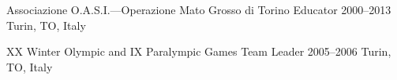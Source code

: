 \begin{cventries}

    

    
  \cventry
    {Associazione O.A.S.I.---Operazione Mato Grosso di Torino} %
    {Educator} %
    {2000--2013} %
    {Turin, TO, Italy} %
    {}

    
\cventry
    {XX Winter Olympic and IX Paralympic Games} %
    {Team Leader} %
    {2005--2006} %
    {Turin, TO, Italy} %
    {}

    
\end{cventries}
